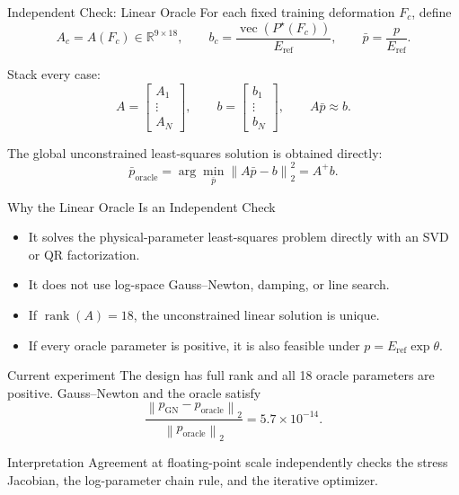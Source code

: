 \documentclass[aspectratio=169,10pt]{beamer}
\newcommand{\vect}[1]{\operatorname{vec}\!\left(#1\right)}
\newcommand{\norm}[1]{\left\lVert #1\right\rVert}
\newcommand{\eref}{E_{\mathrm{ref}}}
\begin{document}
\begin{frame}{Independent Check: Linear Oracle}
  \small
  For each fixed training deformation $F_c$, define
  \[
    A_c=A(F_c)\in\mathbb R^{9\times18},
    \qquad
    b_c=\frac{\vect{P^\star(F_c)}}{\eref},
    \qquad
    \bar p=\frac{p}{\eref}.
  \]

  Stack every case:
  \[
    A=
    \begin{bmatrix}A_1\\ \vdots\\ A_N\end{bmatrix},
    \qquad
    b=
    \begin{bmatrix}b_1\\ \vdots\\ b_N\end{bmatrix},
    \qquad
    A\bar p\approx b.
  \]

  The global unconstrained least-squares solution is obtained directly:
  \[
    \boxed{
      \bar p_{\mathrm{oracle}}
      =
      \arg\min_{\bar p}\norm{A\bar p-b}_2^2
      =
      A^+b
    }.
  \]
\end{frame}

\begin{frame}{Why the Linear Oracle Is an Independent Check}
  \small
  \begin{itemize}
    \item It solves the physical-parameter least-squares problem directly with
      an SVD or QR factorization.
    \item It does not use log-space Gauss--Newton, damping, or line search.
    \item If $\operatorname{rank}(A)=18$, the unconstrained linear solution is
      unique.
    \item If every oracle parameter is positive, it is also feasible under
      $p=\eref\exp\theta$.
  \end{itemize}

  \begin{block}{Current experiment}
    The design has full rank and all 18 oracle parameters are positive.
    Gauss--Newton and the oracle satisfy
    \[
      \frac{\norm{p_{\mathrm{GN}}-p_{\mathrm{oracle}}}_2}
           {\norm{p_{\mathrm{oracle}}}_2}
      =5.7\times10^{-14}.
    \]
  \end{block}

  \begin{alertblock}{Interpretation}
    Agreement at floating-point scale independently checks the stress
    Jacobian, the log-parameter chain rule, and the iterative optimizer.
  \end{alertblock}
\end{frame}
\end{document}
